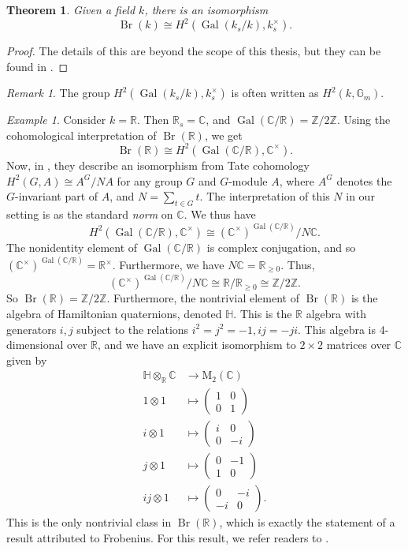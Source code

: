 \documentclass[12pt,twoside]{reedthesis}
\theoremstyle{plain}
\newtheorem{theorem}{Theorem}[chapter]
\theoremstyle{definition}
\theoremstyle{remark}
\newtheorem{remark}{Remark}[section]
\newtheorem{example}{Example}[section]
\newcommand{\ZZ}{\mathbb{Z}}
\newcommand{\RR}{\mathbb{R}}
\newcommand{\CC}{\mathbb{C}}
\newcommand{\Br}{\operatorname{Br}}
\newcommand{\Gal}{\operatorname{Gal}}
\begin{document}
\begin{theorem}
Given a field $k$, there is an isomorphism 
\[
\Br(k)\cong H^2(\Gal(k_s/k),k_s^\times).
\]
\end{theorem}
\begin{proof}
The details of this are beyond the scope of this thesis, but they can be found in \cite[X.5]{serreLF}.
\end{proof}
\begin{remark} 
The group $H^2(\Gal(k_s/k),k_s^\times)$ is often written as $H^2(k,\mathbb{G}_m)$.
\end{remark}
\begin{example}
Consider $k=\RR$. Then $\RR_s=\CC$, and $\Gal(\CC/\RR)=\ZZ/2\ZZ$. Using the cohomological interpretation of $\Br(\RR)$, we get
\[
\Br(\RR)\cong H^2(\Gal(\CC/\RR),\CC^\times).
\]
Now, in \cite[VIII.4]{serreLF}, they describe an isomorphism from Tate cohomology $H^2(G,A)\cong A^G/NA$ for any group $G$ and $G$-module $A$, where $A^G$ denotes the $G$-invariant part of $A$, and $N=\sum_{t\in G}t.$ The interpretation of this $N$ in our setting is as the standard \emph{norm} on $\CC$. We thus have
\[
H^2(\Gal(\CC/\RR),\CC^\times)\cong (\CC^\times)^{\Gal(\CC/\RR)}/N\CC.
\]
The nonidentity element of $\Gal(\CC/\RR)$ is complex conjugation, and so $(\CC^\times)^{\Gal(\CC/\RR)}=\RR^\times$. Furthermore, we have $N\CC=\RR_{\geq0}$. Thus,
\[
(\CC^\times)^{\Gal(\CC/\RR)}/N\CC\cong\RR/\RR_{\geq0}\cong\ZZ/2\ZZ.
\]
So $\Br(\RR)=\ZZ/2\ZZ$. Furthermore, the nontrivial element of $\Br(\RR)$ is the algebra of Hamiltonian quaternions, denoted $\mathbb{H}$. This is the $\RR$ algebra with generators $i,j$ subject to the relations $i^2=j^2=-1, ij=-ji$. This algebra is 4-dimensional over $\RR$, and we have an explicit isomorphism to $2\times2$ matrices over $\CC$ given by
\begin{align*}
\mathbb{H}\otimes_\RR\CC&\longrightarrow\text{M}_2(\CC)\\
1\otimes 1&\longmapsto\begin{pmatrix}1&0\\0&1\end{pmatrix}\\
i\otimes 1&\longmapsto\begin{pmatrix}i&0\\0&-i\end{pmatrix}\\
j\otimes 1&\longmapsto\begin{pmatrix}0&-1\\1&0\end{pmatrix}\\
ij\otimes 1&\longmapsto\begin{pmatrix}0&-i\\-i&0\end{pmatrix}.
\end{align*}
This is the only nontrivial class in $\Br(\RR)$, which is exactly the statement of a result attributed to Frobenius. For this result, we refer readers to \cite[Section 0.2.7]{bahturin}.
\end{example}
\end{document}
